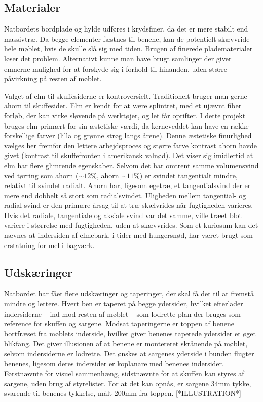 \subsection*{Materialer}
Natbordets bordplade og hylde udføres i krydsfiner, da det er mere stabilt
end massivtræ. Da begge elementer fæstnes til benene, kan de potentielt
skævvride hele møblet, hvis de skulle slå sig med tiden. Brugen af finerede
pladematerialer løser det problem. Alternativt kunne man have brugt samlinger
der giver emnerne mulighed for at forskyde sig i forhold til hinanden, uden
større påvirkning på resten af møblet.

Valget af elm til skuffesiderne er kontroversielt. Traditionelt bruger man gerne
ahorn til skuffesider.
Elm er kendt for at være splintret, med et ujævnt fiber forløb, der kan virke
sløvende på værktøjer, og let får oprifter\footnotemark. I dette projekt bruges
elm primært for sin æstetiske værdi, da kerneveddet kan have en række
forskellige farver (lilla og grønne strøg langs årene). Denne æstetiske
finurlighed vælges her fremfor den lettere arbejdsproces og større farve
kontrast ahorn havde givet (kontrast til skuffefronten i amerikansk valnød). Det
viser sig imidlertid at elm har flere glimrende egenskaber. Selvom det har
omtrent samme volumensvind ved tørring som ahorn ($\sim12\%$, ahorn $\sim11\%$)
er svindet tangentialt mindre, relativt til svindet radialt. Ahorn har, ligesom
egetræ, et tangentialsvind der er mere end dobbelt så stort som radialsvindet.
Uligheden mellem tangential- og radial-svind er den primære årsag til at træ
skælvrides når fugtigheden varieres. Hvis det radiale, tangentiale og aksiale
svind var det samme, ville træet blot variere i størrelse med fugtigheden, uden
at skævvrides. Som et kuriosum kan det nævnes at indersiden af elmebark, i tider
med hungersnød, har været brugt som erstatning for mel i bagværk.


\subsection*{Udskæringer}
Natbordet har fået flere udskæringer og taperinger, der skal få det til at
fremstå mindre og lettere. Hvert ben er taperet på begge ydersider,
hvilket  efterlader indersiderne -- ind mod resten af
møblet -- som lodrette plan der bruges som reference for skuffen og sargene.
Modsat taperingerne er toppen af benene bortfræset fra møblets inderside, hvilket
giver benenes taperede ydersider et øget blikfang. Det giver illusionen af at
benene er montereret skrånende på møblet, selvom indersiderne
er lodrette. Det ønskes at sargenes yderside i bunden flugter benenes, ligesom
deres indersider er koplanare med benenes indersider. Førstnævnte for visuel
sammenhæng, sidstnævnte for at skuffen kan styres af sargene, uden brug af
styrelister. For at det kan opnås, er sargene 34mm tykke, svarende til benenes
tykkelse, målt 200mm fra toppen. [*ILLUSTRATION*]

